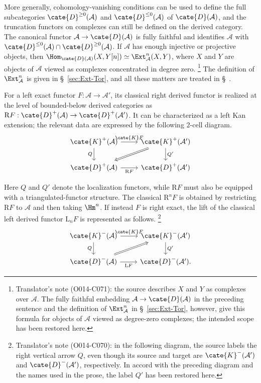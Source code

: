 More generally, cohomology-vanishing conditions can be used to define the
full subcategories $\cate{D}^{\geq0}(\mathcal{A})$ and
$\cate{D}^{\leq0}(\mathcal{A})$ of $\cate{D}(\mathcal{A})$, and the
truncation functors on complexes can still be defined on the derived
category. The canonical functor
$\mathcal{A}\to\cate{D}(\mathcal{A})$ is fully faithful and identifies
$\mathcal{A}$ with
$\cate{D}^{\leq0}(\mathcal{A})\cap\cate{D}^{\geq0}(\mathcal{A})$. If
$\mathcal{A}$ has enough injective or projective objects, then
$\Hom_{\cate{D}(\mathcal{A})}(X,Y[n])\simeq
\Ext^n_{\mathcal{A}}(X,Y)$, where $X$ and $Y$ are objects of $\mathcal{A}$
viewed as complexes concentrated in degree zero.%
\footnote{Translator's note (O014-C071): the source describes $X$ and $Y$ as
complexes over $\mathcal{A}$. The fully faithful embedding
$\mathcal{A}\to\cate{D}(\mathcal{A})$ in the preceding sentence and the
definition of $\Ext^n_{\mathcal{A}}$ in \S~\ref{sec:Ext-Tor}, however, give
this formula for objects of $\mathcal{A}$ viewed as degree-zero complexes;
the intended scope has been restored here.}
The definition of $\Ext^n_{\mathcal{A}}$ is given in
\S~\ref{sec:Ext-Tor}, and all these matters are treated in
\S~.

For a left exact functor $F:\mathcal{A}\to\mathcal{A}'$, its classical right
derived functor is realized at the level of bounded-below derived categories
as $\mathrm{R}F:\cate{D}^+(\mathcal{A})\to\cate{D}^+(\mathcal{A}')$. It
can be characterized as a left Kan extension; the relevant data are expressed
by the following $2$-cell diagram.
\[\begin{tikzcd}
	\cate{K}^+(\mathcal{A}) \arrow[r, "{\cate{K}F}"] \arrow[d, "Q"'] &
	\cate{K}^+(\mathcal{A}') \arrow[d, "{Q'}"] \arrow[Rightarrow, ld] \\
	\cate{D}^+(\mathcal{A}) \arrow[r, "{\mathrm{R}F}"'] &
	\cate{D}^+(\mathcal{A}')
\end{tikzcd}\]

Here $Q$ and $Q'$ denote the localization functors, while
$\mathrm{R}F$ must also be equipped with a triangulated-functor structure.
The classical $\mathrm{R}^nF$ is obtained by restricting $\mathrm{R}F$ to
$\mathcal{A}$ and then taking $\Hm^n$. If instead $F$ is right exact, the
lift of the classical left derived functor $\mathrm{L}_nF$ is represented as
follows.%
\footnote{Translator's note (O014-C070): in the following diagram, the source
labels the right vertical arrow $Q$, even though its source and target are
$\cate{K}^-(\mathcal{A}')$ and $\cate{D}^-(\mathcal{A}')$, respectively.
In accord with the preceding diagram and the names used in the prose, the
label $Q'$ has been restored here.}
\[\begin{tikzcd}
	\cate{K}^-(\mathcal{A}) \arrow[r, "{\cate{K}F}"] \arrow[d, "Q"'] &
	\cate{K}^-(\mathcal{A}') \arrow[d, "{Q'}"] \\
	\cate{D}^-(\mathcal{A}) \arrow[r, "{\mathrm{L}F}"']
	\arrow[ru, Rightarrow] & \cate{D}^-(\mathcal{A}').
\end{tikzcd}\]

